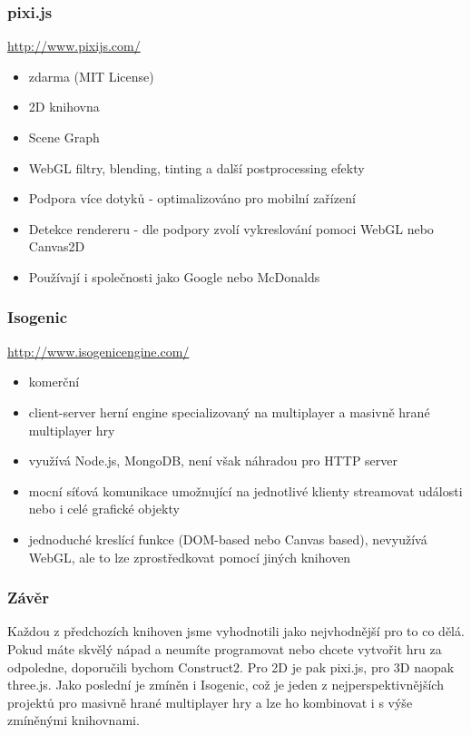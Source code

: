 \documentclass[12pt,a4paper,titlepage,final]{report}
\begin{document}
\subsubsection{pixi.js}

\url{http://www.pixijs.com/}

\begin{itemize}
	\item zdarma (MIT License)
	\item 2D knihovna
	\item Scene Graph
	\item WebGL filtry, blending, tinting a další postprocessing efekty
	\item Podpora více dotyků - optimalizováno pro mobilní zařízení
	\item Detekce rendereru - dle podpory zvolí vykreslování pomoci WebGL nebo Canvas2D
	\item Používají i společnosti jako Google nebo McDonalds
\end{itemize}

\subsubsection{Isogenic}

\url{http://www.isogenicengine.com/}

\begin{itemize}
	\item komerční
	\item client-server herní engine specializovaný na multiplayer a masivně hrané multiplayer hry
	\item využívá Node.js, MongoDB, není však náhradou pro HTTP server
	\item mocní síťová komunikace umožnující na jednotlivé klienty streamovat události nebo i celé grafické objekty
	\item jednoduché kreslící funkce (DOM-based nebo Canvas based), nevyužívá WebGL, ale to lze zprostředkovat pomocí jiných knihoven
\end{itemize}

\subsubsection{Závěr}

Každou z předchozích knihoven jsme vyhodnotili jako nejvhodnější pro to co dělá. Pokud máte skvělý nápad a neumíte programovat nebo chcete vytvořit hru za odpoledne, doporučili bychom Construct2. Pro 2D je pak pixi.js, pro 3D naopak three.js. Jako poslední je zmíněn i Isogenic, což je jeden z nejperspektivnějších projektů pro masivně hrané multiplayer hry a lze ho kombinovat i s výše zmíněnými knihovnami.
\end{document}
